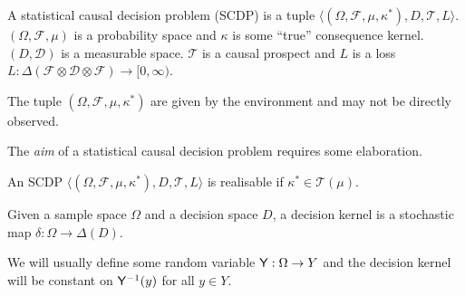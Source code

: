 \begin{definition}\label{def:SCDP}
A statistical causal decision problem (SCDP) is a tuple $\langle (\Omega,\mathcal{F},\mu,\kappa^*), D, \mathscr{T}, L\rangle$. $(\Omega,\mathcal{F},\mu)$ is a probability space and $\kappa$ is some ``true'' consequence kernel. $(D,\mathcal{D})$ is a measurable space. $\mathscr{T}$ is a causal prospect and $L$ is a loss $L:\Delta(\mathcal{F}\otimes\mathcal{D}\otimes\mathcal{F})\to [0,\infty)$.

The tuple $(\Omega,\mathcal{F},\mu,\kappa^*)$ are given by the environment and may not be directly observed.
\end{definition}


The \emph{aim} of a statistical causal decision problem requires some elaboration.

\begin{definition}[Realisable]
An SCDP $\langle (\Omega,\mathcal{F},\mu,\kappa^*), D, \mathscr{T}, L\rangle$ is realisable if $\kappa^*\in \mathscr{T}(\mu)$.
\end{definition}


\begin{definition}
Given a sample space $\Omega$ and a decision space $D$, a decision kernel is a stochastic map $\delta:\Omega \to \Delta(D)$.

We will usually define some random variable $\mathsf{Y}:\Omega\to Y$ and the decision kernel will be constant on $\mathsf{Y}^{-1}(y)$ for all $y\in Y$.
\end{definition}

